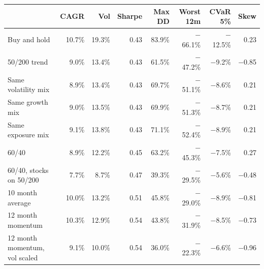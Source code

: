 \begin{tabular}{lrrrrrrr}
\toprule
 & CAGR & Vol & Sharpe & Max DD & Worst 12m & CVaR 5\% & Skew \\
\midrule
Buy and hold & 10.7\% & 19.3\% & 0.43 & 83.9\% & $-$66.1\% & $-$12.5\% & 0.23 \\
50/200 trend & 9.0\% & 13.4\% & 0.43 & 61.5\% & $-$47.2\% & $-$9.2\% & $-$0.85 \\
Same volatility mix & 8.9\% & 13.4\% & 0.43 & 69.7\% & $-$51.1\% & $-$8.6\% & 0.21 \\
Same growth mix & 9.0\% & 13.5\% & 0.43 & 69.9\% & $-$51.3\% & $-$8.7\% & 0.21 \\
Same exposure mix & 9.1\% & 13.8\% & 0.43 & 71.1\% & $-$52.4\% & $-$8.9\% & 0.21 \\
60/40 & 8.9\% & 12.2\% & 0.45 & 63.2\% & $-$45.3\% & $-$7.5\% & 0.27 \\
60/40, stocks on 50/200 & 7.7\% & 8.7\% & 0.47 & 39.3\% & $-$29.5\% & $-$5.6\% & $-$0.48 \\
10 month average & 10.0\% & 13.2\% & 0.51 & 45.8\% & $-$29.0\% & $-$8.9\% & $-$0.81 \\
12 month momentum & 10.3\% & 12.9\% & 0.54 & 43.8\% & $-$31.9\% & $-$8.5\% & $-$0.73 \\
12 month momentum, vol scaled & 9.1\% & 10.0\% & 0.54 & 36.0\% & $-$22.3\% & $-$6.6\% & $-$0.96 \\
\bottomrule
\end{tabular}
